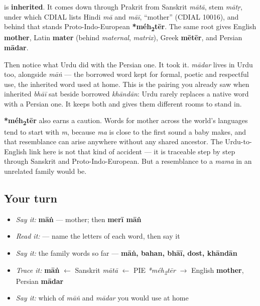 \begin{cousinweb}
\textbf{} is \textbf{inherited}. It comes down through Prakrit from Sanskrit \emph{mātā}, stem \emph{mātṛ}, under which CDIAL lists Hindi \emph{mā} and \emph{māī}, \textquotedblleft{}mother\textquotedblright{} (CDIAL 10016), and behind that stands Proto-Indo-European \textbf{*méh\textsubscript{2}tēr}. The same root gives English \textbf{mother}, Latin \textbf{mater} (behind \emph{maternal}, \emph{matrix}), Greek \textbf{mētēr}, and Persian \textbf{mādar}.

Then notice what Urdu did with the Persian one. It took it. \emph{mādar} lives in Urdu too, alongside \emph{māṅ} — the borrowed word kept for formal, poetic and respectful use, the inherited word used at home. This is the pairing you already saw when inherited \emph{bhāī} sat beside borrowed \emph{khāndān}: Urdu rarely replaces a native word with a Persian one. It keeps both and gives them different rooms to stand in.

\textbf{*méh\textsubscript{2}tēr} also earns a caution. Words for mother across the world's languages tend to start with \emph{m}, because \emph{ma} is close to the first sound a baby makes, and that resemblance can arise anywhere without any shared ancestor. The Urdu-to-English link here is not that kind of accident — it is traceable step by step through Sanskrit and Proto-Indo-European. But a resemblance to a \emph{mama} in an unrelated family would be.
\end{cousinweb}

\subsection*{Your turn}
\begin{itemize}
\raggedright
  \item \emph{Say it:} \textbf{māṅ} — mother; then \textbf{merī māṅ}
  \item \emph{Read it:}     — name the letters of each word, then say it
  \item \emph{Say it:} the family words so far — \textbf{māṅ, bahan, bhāī, dost, khāndān}
  \item \emph{Trace it:} \textbf{māṅ} $\leftarrow$ Sanskrit \emph{mātā} $\leftarrow$ PIE \emph{*méh\textsubscript{2}tēr} $\to$ English \textbf{mother}, Persian \textbf{mādar}
  \item \emph{Say it:} which of \emph{māṅ} and \emph{mādar} you would use at home
\end{itemize}


